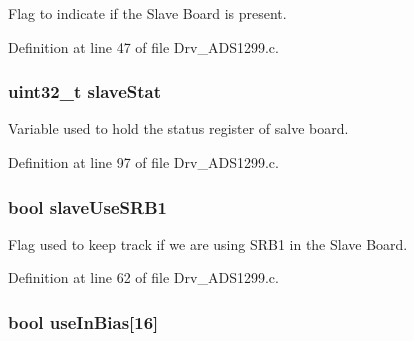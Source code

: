 Flag to indicate if the Slave Board is present. 



Definition at line 47 of file Drv\+\_\+\+A\+D\+S1299.\+c.

\subsubsection[{\texorpdfstring{slave\+Stat}{slaveStat}}]{\setlength{\rightskip}{0pt plus 5cm}uint32\+\_\+t slave\+Stat}\hypertarget{group__ADS1299__Library_ga107f0202d1ef78dcc5b63e143044ffdf}{}\label{group__ADS1299__Library_ga107f0202d1ef78dcc5b63e143044ffdf}


Variable used to hold the status register of salve board. 



Definition at line 97 of file Drv\+\_\+\+A\+D\+S1299.\+c.

\subsubsection[{\texorpdfstring{slave\+Use\+S\+R\+B1}{slaveUseSRB1}}]{\setlength{\rightskip}{0pt plus 5cm}bool slave\+Use\+S\+R\+B1}\hypertarget{group__ADS1299__Library_gab67cf8829f1fda0edfe4fcb89a00f8d1}{}\label{group__ADS1299__Library_gab67cf8829f1fda0edfe4fcb89a00f8d1}


Flag used to keep track if we are using S\+R\+B1 in the Slave Board. 



Definition at line 62 of file Drv\+\_\+\+A\+D\+S1299.\+c.

\subsubsection[{\texorpdfstring{use\+In\+Bias}{useInBias}}]{\setlength{\rightskip}{0pt plus 5cm}bool use\+In\+Bias\mbox{[}16\mbox{]}}\hypertarget{group__ADS1299__Library_gaab7b7dca51dd80f61785f355b03b0555}{}\label{group__ADS1299__Library_gaab7b7dca51dd80f61785f355b03b0555}


